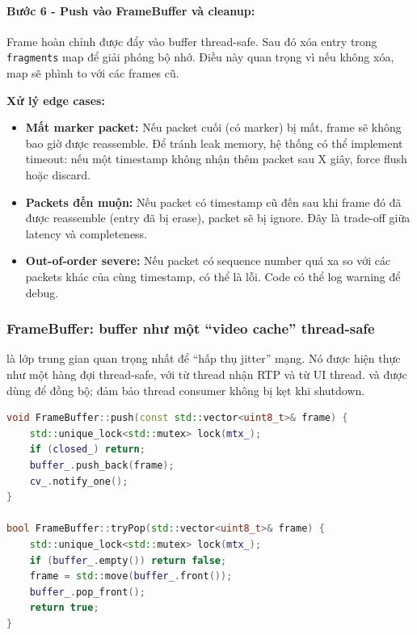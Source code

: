 \paragraph{Bước 6 - Push vào FrameBuffer và cleanup:} Frame hoàn chỉnh được đẩy vào buffer thread-safe. Sau đó xóa entry trong \texttt{fragments} map để giải phóng bộ nhớ. Điều này quan trọng vì nếu không xóa, map sẽ phình to với các frames cũ.

\textbf{Xử lý edge cases:}

\begin{itemize}
\item \textbf{Mất marker packet:} Nếu packet cuối (có marker) bị mất, frame sẽ không bao giờ được reassemble. Để tránh leak memory, hệ thống có thể implement timeout: nếu một timestamp không nhận thêm packet sau X giây, force flush hoặc discard.

\item \textbf{Packets đến muộn:} Nếu packet có timestamp cũ đến sau khi frame đó đã được reassemble (entry đã bị erase), packet sẽ bị ignore. Đây là trade-off giữa latency và completeness.

\item \textbf{Out-of-order severe:} Nếu packet có sequence number quá xa so với các packets khác của cùng timestamp, có thể là lỗi. Code có thể log warning để debug.
\end{itemize}

\subsubsection{FrameBuffer: buffer như một ``video cache'' thread-safe}

 là lớp trung gian quan trọng nhất để ``hấp thụ jitter'' mạng. Nó được hiện thực như một hàng đợi thread-safe, với  từ thread nhận RTP và  từ UI thread.  và  được dùng để đồng bộ;  đảm bảo thread consumer không bị kẹt khi shutdown.

\begin{lstlisting}[language=C++, caption={FrameBuffer đồng bộ bằng mutex + condition variable}, label={lst:framebuffer_push_pop}]
void FrameBuffer::push(const std::vector<uint8_t>& frame) {
    std::unique_lock<std::mutex> lock(mtx_);
    if (closed_) return;
    buffer_.push_back(frame);
    cv_.notify_one();
}

bool FrameBuffer::tryPop(std::vector<uint8_t>& frame) {
    std::unique_lock<std::mutex> lock(mtx_);
    if (buffer_.empty()) return false;
    frame = std::move(buffer_.front());
    buffer_.pop_front();
    return true;
}
\end{lstlisting}

